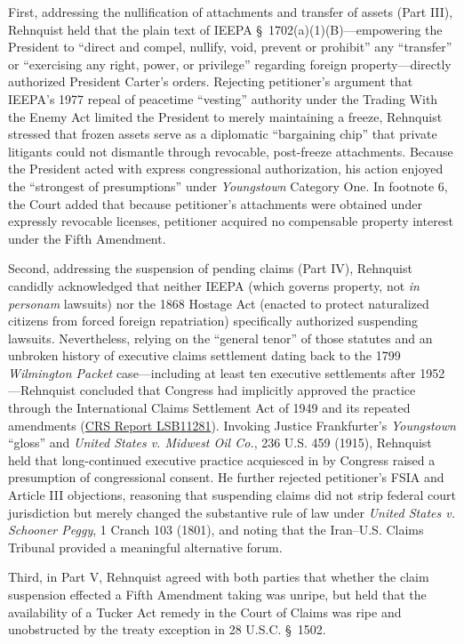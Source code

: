\documentclass[12pt]{article}
\begin{document}
First, addressing the nullification of attachments and transfer of assets (Part III), Rehnquist held that the plain text of IEEPA \S\ 1702(a)(1)(B)---empowering the President to ``direct and compel, nullify, void, prevent or prohibit'' any ``transfer'' or ``exercising any right, power, or privilege'' regarding foreign property---directly authorized President Carter's orders. Rejecting petitioner's argument that IEEPA's 1977 repeal of peacetime ``vesting'' authority under the Trading With the Enemy Act limited the President to merely maintaining a freeze, Rehnquist stressed that frozen assets serve as a diplomatic ``bargaining chip'' that private litigants could not dismantle through revocable, post-freeze attachments. Because the President acted with express congressional authorization, his action enjoyed the ``strongest of presumptions'' under \textit{Youngstown} Category One. In footnote 6, the Court added that because petitioner's attachments were obtained under expressly revocable licenses, petitioner acquired no compensable property interest under the Fifth Amendment.

Second, addressing the suspension of pending claims (Part IV), Rehnquist candidly acknowledged that neither IEEPA (which governs property, not \textit{in personam} lawsuits) nor the 1868 Hostage Act (enacted to protect naturalized citizens from forced foreign repatriation) specifically authorized suspending lawsuits. Nevertheless, relying on the ``general tenor'' of those statutes and an unbroken history of executive claims settlement dating back to the 1799 \textit{Wilmington Packet} case---including at least ten executive settlements after 1952---Rehnquist concluded that Congress had implicitly approved the practice through the International Claims Settlement Act of 1949 and its repeated amendments (\href{https://www.everycrsreport.com/reports/LSB11281.html}{CRS Report LSB11281}). Invoking Justice Frankfurter's \textit{Youngstown} ``gloss'' and \textit{United States v. Midwest Oil Co.}, 236 U.S. 459 (1915), Rehnquist held that long-continued executive practice acquiesced in by Congress raised a presumption of congressional consent. He further rejected petitioner's FSIA and Article III objections, reasoning that suspending claims did not strip federal court jurisdiction but merely changed the substantive rule of law under \textit{United States v. Schooner Peggy}, 1 Cranch 103 (1801), and noting that the Iran--U.S. Claims Tribunal provided a meaningful alternative forum.

Third, in Part V, Rehnquist agreed with both parties that whether the claim suspension effected a Fifth Amendment taking was unripe, but held that the availability of a Tucker Act remedy in the Court of Claims was ripe and unobstructed by the treaty exception in 28 U.S.C. \S\ 1502.
\end{document}
